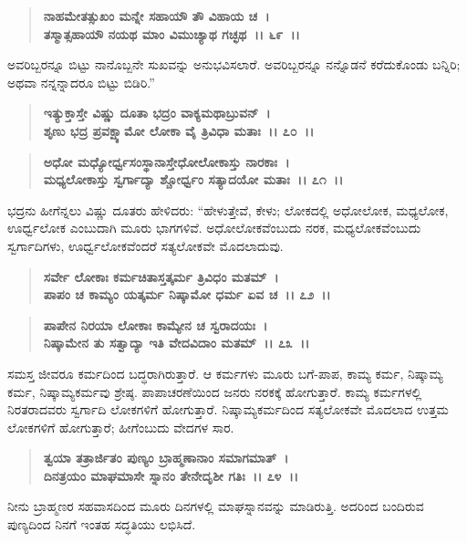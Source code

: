 \begin{verse}
\textbf{ನಾಹಮೇತತ್ಸುಖಂ ಮನ್ನೇ ಸಹಾಯೌ ತೌ ವಿಹಾಯ ಚ~।}\\\textbf{ತಸ್ಮಾತ್ಸಹಾಯೌ ನಯಥ ಮಾಂ ವಿಮುಚ್ಯಾಥ ಗಚ್ಛಥ~।। ೬೯~।।}
\end{verse}

ಅವರಿಬ್ಬರನ್ನೂ ಬಿಟ್ಟು ನಾನೊಬ್ಬನೇ ಸುಖವನ್ನು ಅನುಭವಿಸಲಾರೆ. ಅವರಿಬ್ಬರನ್ನೂ ನನ್ನೊಡನೆ ಕರೆದುಕೊಂಡು ಬನ್ನಿರಿ; ಅಥವಾ ನನ್ನನ್ನಾದರೂ ಬಿಟ್ಟು ಬಿಡಿರಿ.”

\begin{verse}
\textbf{ಇತ್ಯುಕ್ತಾಸ್ತೇ ವಿಷ್ಣು ದೂತಾ ಭದ್ರಂ ವಾಕ್ಯಮಥಾಬ್ರುವನ್~।}\\\textbf{ಶೃಣು ಭದ್ರ ಪ್ರವಕ್ಷ್ಯಾಮೋ ಲೋಕಾ ವೈ ತ್ರಿವಿಧಾ ಮತಾಃ~।। ೭೦~।। }
\end{verse}

\begin{verse}
\textbf{ಅಧೋ ಮಧ್ಯೋರ್ಧ್ವಸಂಸ್ಥಾನಾಸ್ತೇಧೋಲೋಕಾಸ್ತು ನಾರಕಾಃ~।}\\\textbf{ಮಧ್ಯಲೋಕಾಸ್ತು ಸ್ವರ್ಗಾದ್ಯಾ ಶ್ಚೋರ್ಧ್ವಂ ಸತ್ಯಾದಯೋ ಮತಾಃ~।। ೭೧~।।}
\end{verse}

ಭದ್ರನು ಹೀಗೆನ್ನಲು ವಿಷ್ಣು ದೂತರು ಹೇಳಿದರು: “ಹೇಳುತ್ತೇವೆ, ಕೇಳು; ಲೋಕದಲ್ಲಿ ಅಧೋಲೋಕ, ಮಧ್ಯಲೋಕ, ಊರ್ಧ್ವಲೋಕ ಎಂಬುದಾಗಿ ಮೂರು ಭಾಗಗಳಿವೆ. ಅಧೋಲೋಕವೆಂಬುದು ನರಕ, ಮಧ್ಯಲೋಕವೆಂಬುದು ಸ್ವರ್ಗಾದಿಗಳು, ಊರ್ಧ್ವಲೋಕವೆಂದರೆ ಸತ್ಯಲೋಕವೇ ಮೊದಲಾದುವು.

\begin{verse}
\textbf{ಸರ್ವೇ ಲೋಕಾಃ ಕರ್ಮಚಿತಾಸ್ತತ್ಕರ್ಮ ತ್ರಿವಿಧಂ ಮತಮ್~।}\\\textbf{ಪಾಪಂ ಚ ಕಾಮ್ಯಂ ಯತ್ಕರ್ಮ ನಿಷ್ಕಾಮೋ ಧರ್ಮ ಏವ ಚ~।। ೭೨~।।} 
\end{verse}

\begin{verse}
\textbf{ಪಾಪೇನ ನಿರಯಾ ಲೋಕಾಃ ಕಾಮ್ಯೇನ ಚ ಸ್ವರಾದಯಃ~।}\\\textbf{ನಿಷ್ಕಾಮೇನ ತು ಸತ್ವಾದ್ಯಾ ಇತಿ ವೇದವಿದಾಂ ಮತಮ್~।। ೭೩~।।}
\end{verse}

ಸಮಸ್ತ ಜೀವರೂ ಕರ್ಮದಿಂದ ಬದ್ಧರಾಗಿರುತ್ತಾರೆ. ಆ ಕರ್ಮಗಳು ಮೂರು ಬಗೆ-ಪಾಪ, ಕಾಮ್ಯ ಕರ್ಮ, ನಿಷ್ಕಾಮ್ಯ ಕರ್ಮ, ನಿಷ್ಕಾಮ್ಯಕರ್ಮವು ಶ್ರೇಷ್ಠ. ಪಾಪಾಚರಣೆಯಿಂದ ಜನರು ನರಕಕ್ಕೆ ಹೋಗುತ್ತಾರೆ. ಕಾಮ್ಯ ಕರ್ಮಗಳಲ್ಲಿ ನಿರತರಾದವರು ಸ್ವರ್ಗಾದಿ ಲೋಕಗಳಿಗೆ ಹೋಗುತ್ತಾರೆ. ನಿಷ್ಕಾಮ್ಯಕರ್ಮದಿಂದ ಸತ್ಯಲೋಕವೇ ಮೊದಲಾದ ಉತ್ತಮ ಲೋಕಗಳಿಗೆ ಹೋಗುತ್ತಾರೆ; ಹೀಗೆಂಬುದು ವೇದಗಳ ಸಾರ.

\begin{verse}
\textbf{ತ್ವಯಾ ತತ್ರಾರ್ಜಿತಂ ಪುಣ್ಯಂ ಬ್ರಾಹ್ಮಣಾನಾಂ ಸಮಾಗಮಾತ್~।}\\\textbf{ದಿನತ್ರಯಂ ಮಾಘಮಾಸೇ ಸ್ನಾನಂ ತೇನೇದೃಶೀ ಗತಿಃ~।। ೭೪~।।}
\end{verse}

ನೀನು ಬ್ರಾಹ್ಮಣರ ಸಹವಾಸದಿಂದ ಮೂರು ದಿನಗಳಲ್ಲಿ ಮಾಘಸ್ನಾನವನ್ನು ಮಾಡಿರುತ್ತಿ. ಅದರಿಂದ ಬಂದಿರುವ ಪುಣ್ಯದಿಂದ ನಿನಗೆ ಇಂತಹ ಸದ್ಧತಿಯು ಲಭಿಸಿದೆ.


